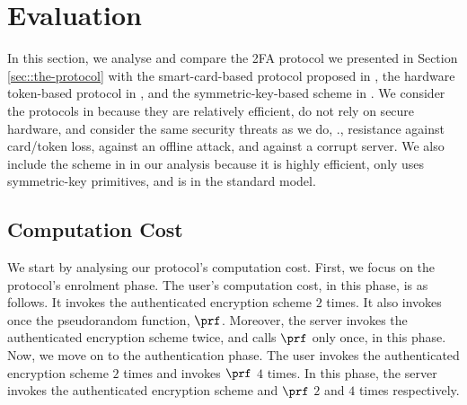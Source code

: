 

\section{Evaluation}\label{app:long-eval}

In this section, we analyse and compare the 2FA protocol we presented in Section \ref{sec::the-protocol} with the smart-card-based protocol proposed in  \cite{WangW18}, the hardware token-based protocol in \cite{JareckiJKSS21}, and the symmetric-key-based scheme in  \cite{MatsuoMY11}.  We consider the protocols in  \cite{WangW18,JareckiJKSS21} because they are relatively efficient, do not rely on secure hardware, and consider the same security threats as we do, \ie., resistance against card/token loss, against an offline attack, and against a corrupt server. We also include the scheme in  \cite{MatsuoMY11}  in our analysis because it is highly efficient, only uses symmetric-key primitives, and is in the standard model. 
 









\subsection{Computation Cost}

We start by analysing our protocol's computation cost. First, we focus on the protocol's enrolment phase. The user's computation cost, in this phase, is as follows. It invokes the authenticated encryption scheme $2$ times. It also invokes once the pseudorandom function, $\prf$.
%
% 
  Moreover, the server invokes the authenticated encryption scheme twice, and calls $\prf$ only once, in this phase. 
%  
%
Now, we move on to the authentication phase. The user invokes the authenticated encryption scheme $2$ times and invokes $\prf$ $4$ times. 
%
%
 In this phase, the server invokes the authenticated encryption scheme and $\prf$ $2$ and $4$ times respectively. %

